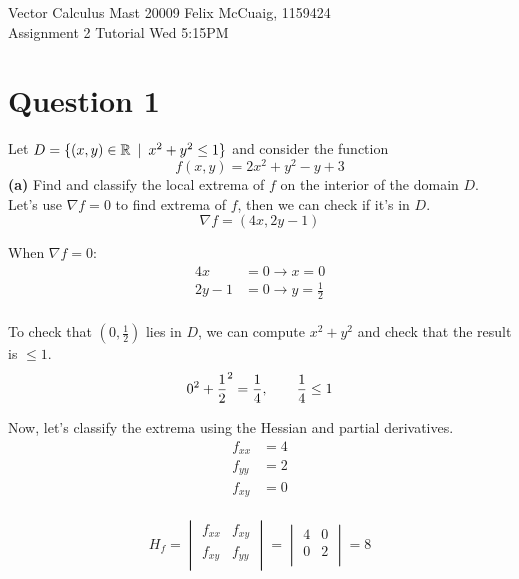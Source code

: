 \documentclass[12pt]{article}
\begin{document}
Vector Calculus Mast 20009 \hfill Felix McCuaig, 1159424 \\
Assignment 2 \hfill Tutorial Wed 5:15PM  

\section*{Question 1}
Let $D=\{ (x,y) \in \mathbb{R} \hspace{5px} | \hspace{5px} x^2+y^2\leq 1 \}$ and consider the function
$$
	f(x,y)=2x^2+y^2-y+3
$$
\textbf{(a)} Find and classify the local extrema of $f$ on the interior of the domain $D$.\\
\medskip
Let's use $\nabla f = 0$ to find extrema of $f$, then we can check if it's in $D$.\\
$$
\nabla f = (4x, 2y-1)
$$

When $\nabla f = 0$:
\begin{align*}
	4x &= 0 \rightarrow x = 0 \\
	2y-1 &=0 \rightarrow y = \frac{1}{2}\\
\end{align*}

To check that $\left(0, \frac{1}{2}\right)$ lies in $D$, we can compute $x^2+y^2$ and check that the result is $\leq  1$.
$$
	0^2+\frac{1}{2}^2=\frac{1}{4}, \hspace{20px} \frac{1}{4} \leq 1 
$$

Now, let's classify the extrema using the Hessian and partial derivatives.
\begin{align*}
	f_{xx} &= 4 \\
	f_{yy} &= 2 \\
	f_{xy} &= 0 \\
\end{align*}

$$
	H_f =
\begin{vmatrix}
f_{xx} & f_{xy} \\
f_{xy} & f_{yy} \\
\end{vmatrix}
=
\begin{vmatrix}
4 & 0 \\
0 & 2 \\
\end{vmatrix}
= 8
$$
\end{document}
